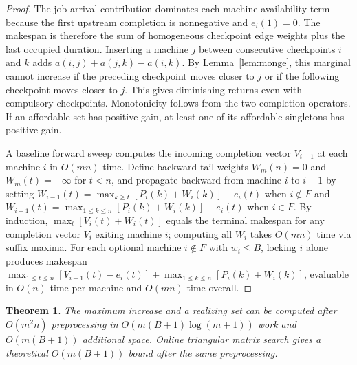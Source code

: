 \documentclass[11pt,letterpaper]{article}
\newtheorem{theorem}{Theorem}
\begin{document}
\begin{proof}
The job-arrival contribution dominates each machine availability term because the first upstream completion is nonnegative and $e_i(1)=0$. The makespan is therefore the sum of homogeneous checkpoint edge weights plus the last occupied duration. Inserting a machine $j$ between consecutive checkpoints $i$ and $k$ adds $a(i,j)+a(j,k)-a(i,k)$. By Lemma~\ref{lem:monge}, this marginal cannot increase if the preceding checkpoint moves closer to $j$ or if the following checkpoint moves closer to $j$. This gives diminishing returns even with compulsory checkpoints. Monotonicity follows from the two completion operators. If an affordable set has positive gain, at least one of its affordable singletons has positive gain.

A baseline forward sweep computes the incoming completion vector $V_{i-1}$ at each machine $i$ in $O(mn)$ time. Define backward tail weights $W_m(n)=0$ and $W_m(t)=-\infty$ for $t<n$, and propagate backward from machine $i$ to $i-1$ by setting $W_{i-1}(t)=\max_{k\ge t}[P_i(k)+W_i(k)]-e_i(t)$ when $i\notin F$ and $W_{i-1}(t)=\max_{1\le k\le n}[P_i(k)+W_i(k)]-e_i(t)$ when $i\in F$. By induction, $\max_t[V_i(t)+W_i(t)]$ equals the terminal makespan for any completion vector $V_i$ exiting machine $i$; computing all $W_i$ takes $O(mn)$ time via suffix maxima. For each optional machine $i\notin F$ with $w_i\le B$, locking $i$ alone produces makespan $\max_{1\le t\le n}[V_{i-1}(t)-e_i(t)]+\max_{1\le k\le n}[P_i(k)+W_i(k)]$, evaluable in $O(n)$ time per machine and $O(mn)$ time overall.
\end{proof}

\begin{theorem}
\label{thm:exact}
The maximum increase and a realizing set can be computed after $O(m^2n)$ preprocessing in $O(m(B+1)\log(m+1))$ work and $O(m(B+1))$ additional space. Online triangular matrix search gives a theoretical $O(m(B+1))$ bound after the same preprocessing.
\end{theorem}
\end{document}
